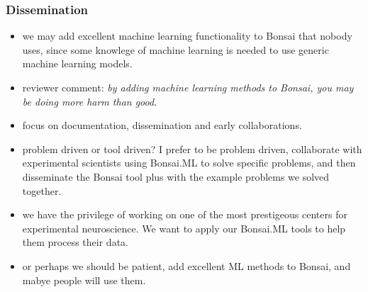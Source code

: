 \begin{frame}
    \frametitle{Dissemination}

    \begin{itemize}[<+->]

        \item we may add excellent machine learning functionality to Bonsai
            that nobody uses, since some knowlege of machine learning is needed
            to use generic machine learning models.

        \item reviewer comment: \emph{by adding machine learning methods
            to Bonsai, you may be doing more harm than good}.

        \item focus on documentation, dissemination and early collaborations.

        \item problem driven or tool driven? I prefer to be problem driven,
            collaborate with experimental scientists using Bonsai.ML to solve
            specific problems, and then disseminate the Bonsai tool plus with
            the example problems we solved together.

        \item we have the privilege of working on one of the most prestigeous
            centers for experimental neuroscience. We want to apply our
            Bonsai.ML tools to help them process their data.

        \item or perhaps we should be patient, add excellent ML methods to
            Bonsai, and mabye people will use them.

    \end{itemize}

\end{frame}

